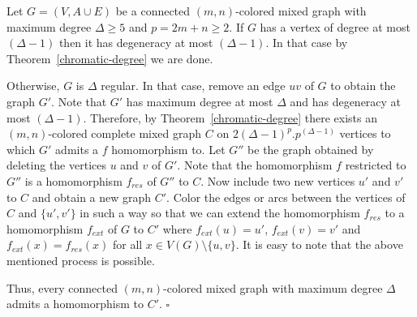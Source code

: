 \documentclass[11pt]{article}
\begin{document}
\medskip

Let $G = (V, A \cup E)$ be a connected $(m,n)$-colored mixed graph with maximum degree $\Delta \geq 5$ and $p = 2m+n \geq 2$. 
If $G$ has a vertex of degree at most $(\Delta-1)$ then it has degeneracy at most $(\Delta-1)$. In that case  by Theorem~\ref{chromatic-degree}
we are done. 

Otherwise, $G$ is $\Delta$ regular. In that case, remove an edge $uv$ of $G$ to obtain the graph $G'$. Note that $G'$ has 
maximum degree at most $\Delta$  and has degeneracy at most $(\Delta-1)$. Therefore, by Theorem~\ref{chromatic-degree} there exists an 
$(m,n)$-colored complete mixed graph $C$ on 
$2 (\Delta-1)^p .p^{(\Delta-1)}$ vertices to which $G'$ admits a $f$ homomorphism to. 
Let $G''$ be the graph obtained by deleting the vertices $u$ and $v$ of $G'$. Note that the homomorphism $f$ restricted to $G''$ is 
 a homomorphism $f_{res}$ of $G''$ to $C$. Now include two new vertices $u'$ and $v'$ to $C$ and obtain a new graph $C'$. 
Color the edges or arcs between the vertices of $C$ and $\{u',v'\}$ in such a way so that we can extend the homomorphism $f_{res}$ to a homomorphism
$f_{ext}$ 
of $G$ to $C'$  where $f_{ext}(u) = u'$, $f_{ext}(v) = v'$ and $f_{ext}(x) = f_{res}(x)$ for all $x \in V(G) \setminus \{u,v\}$. 
It is easy to note that the above mentioned process is possible. 

Thus, every connected $(m,n)$-colored mixed graph with maximum degree $\Delta$ admits a homomorphism to $C'$. 
\hfill $ \square$

   






 
 
\end{document}
